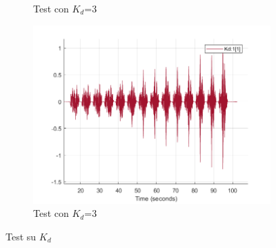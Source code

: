\begin{figure}[!ht]
\begin{subfigure}{.5\textwidth}
  \caption{Test con $K_d$=3}
  \label{fig:sub-kd3}
\end{subfigure}
\begin{subfigure}{.5\textwidth}
  \centering
  \includegraphics[width=.8\linewidth]{Immagini/Sperimentale/Test_Kd=3.png}  
  \caption{Test con $K_d$=3}
  \label{fig:sub-kd1}
\end{subfigure}
\caption{Test su $K_d$}
\label{fig:KdTest}
\end{figure}
